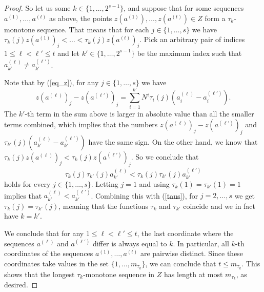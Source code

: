 \begin{proof}
So let us some $k \in \{1, \ldots, 2^{s-1}\}$, and suppose that for some sequences $a^{(1)}, \ldots, a^{(t)}$ as above, the points $z(a^{(1)}), \ldots, z(a^{(t)}) \in Z$ form a $\tau_k$-monotone sequence. That means that for each $j \in \{1, \ldots, s\}$ we have $\tau_k(j) z(a^{(1)})_j<\dots<\tau_k(j) z(a^{(t)})_j$. 
Pick an arbitrary pair of indices $1\le \ell < \ell' \le t$ and let $k' \in \{1, \ldots, 2^{s-1}\}$ be the maximum index such that $a^{(\ell)}_{k'} \neq a^{(\ell')}_{k'}$.

Note that by (\ref{eq_z}), for any $j\in \{1, \ldots, s\}$ we have 
$$
z(a^{(\ell)})_j - z(a^{(\ell')})_j = \sum_{i=1}^{k'} N^i \tau_i(j) (a^{(\ell)}_i - a^{(\ell')}_i).
$$
The $k'$-th term in the sum above is larger in absolute value than all the smaller terms combined, which implies that the numbers $z(a^{(\ell)})_j - z(a^{(\ell')})_j$ and $\tau_{k'}(j)(a^{(\ell)}_{k'} - a^{(\ell')}_{k'})$ have the same sign. On the other hand, we know that $\tau_k(j) z(a^{(\ell)})_j < \tau_k(j) z(a^{(\ell')})_j$. So we conclude that 
\begin{equation}\label{taus}
\tau_{k}(j) \tau_{k'}(j) a^{(\ell)}_{k'} < \tau_{k}(j) \tau_{k'}(j) a^{(\ell')}_{k'}    
\end{equation}
holds for every $j \in \{1, \ldots, s\}$. Letting $j = 1$ and using $\tau_k(1) = \tau_{k'}(1)=1$ implies that $a^{(\ell)}_{k'} < a^{(\ell')}_{k'}$. Combining this with (\ref{taus}), for $j=2,\dots,s$ we get $\tau_k(j) = \tau_{k'}(j)$, meaning that the functions $\tau_k$ and $\tau_{k'}$ coincide and we in fact have $k = k'$.

We conclude that for any $1\le \ell<\ell' \le t$, the last coordinate where the sequences $a^{(\ell)}$ and $a^{(\ell')}$ differ is always equal to $k$. In particular, all $k$-th coordinates of the sequences $a^{(1)}, \ldots, a^{(t)}$ are pairwise distinct. Since these coordinates take values in the set $\{1, \ldots, m_{\tau_k}\}$, we can conclude that $t \le m_{\tau_k}$. This shows that the longest $\tau_k$-monotone sequence in $Z$ has length at most $m_{\tau_k}$, as desired.
\end{proof}

